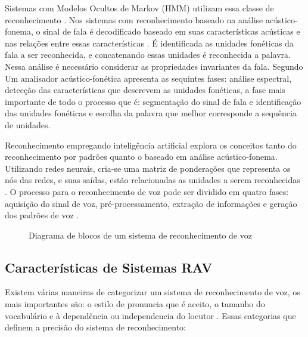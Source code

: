 Sistemas com Modelos Ocultos de Markov (HMM) utilizam essa classe de reconhecimento \cite{AvaliaTecJose}. Nos sistemas com reconhecimento baseado na análise acústico-fonema, o sinal de fala é decodificado baseado em suas características acústicas e nas relações entre essas características \cite{DigSpeechNejat}. É identificada as unidades fonéticas da fala a ser reconhecida, e concatenando essas unidades é reconhecida a palavra. Nessa análise é necessário considerar as propriedades invariantes da fala. Segundo  Um analisador acústico-fonética apresenta as sequintes fases: análise espectral, detecção das características que descrevem as unidades fonéticas, a fase mais importante de todo o processo que é: segmentação do sinal de fala e identificação das unidades fonéticas e escolha da palavra que melhor corresponde a sequência de unidades. 

Reconhecimento empregando inteligência artificial explora os conceitos tanto do reconhecimento por padrões quanto o baseado em análise acústico-fonema. Utilizando redes neurais, cria-se uma matriz de ponderações que representa os nós das redes, e suas saídas, estão relacionadas as unidades a serem reconhecidas \cite{AvaliaTecJose}.
O processo para o reconhecimento de voz pode ser dividido em quatro fases: aquisição do sinal de voz, pré-processamento, extração de informações e geração dos padrões de voz \cite{RavIsolAnderson}.

\begin{figure}[H]
\centering

\caption{Diagrama de blocos de um sistema de reconhecimento de voz}
\end{figure}







\subsection{Características de Sistemas RAV}\label{sec:red_neu}

Existem várias maneiras de categorizar um sistema de reconhecimento de voz, os mais importantes são: o estilo de pronuncia que é aceito, o tamanho do vocabulário e à dependência ou independencia do locutor \cite{RavIsolMartins}. Essas categorias que definem a precisão do sistema de reconhecimento:


